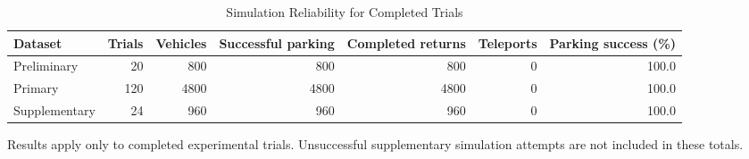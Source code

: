 \begin{table}[t]
\centering
\caption{Simulation Reliability for Completed Trials}
\label{tab:simulation_reliability}
\small
\setlength{\tabcolsep}{4pt}
\begin{adjustbox}{max width=\textwidth}

\begin{tabular}{lrrrrrr}
\toprule
Dataset & Trials & Vehicles & Successful parking & Completed returns & Teleports & Parking success (\%)\\
\midrule
Preliminary & 20 & 800 & 800 & 800 & 0 & 100.0\\
Primary & 120 & 4800 & 4800 & 4800 & 0 & 100.0\\
Supplementary & 24 & 960 & 960 & 960 & 0 & 100.0\\
\bottomrule
\end{tabular}
\end{adjustbox}
\par\smallskip
\begin{minipage}{\textwidth}
\footnotesize
Results apply only to completed experimental trials. Unsuccessful supplementary simulation attempts are not included in these totals.
\end{minipage}
\end{table}
